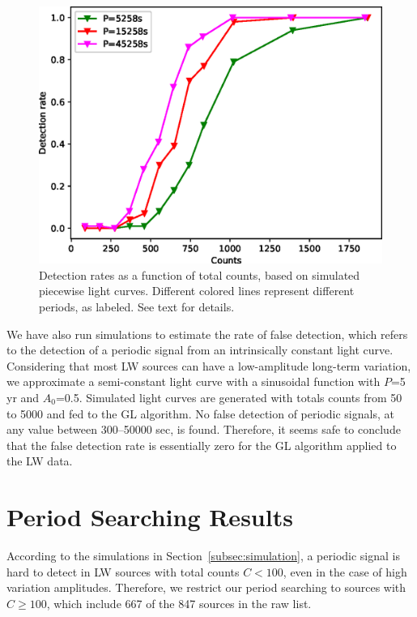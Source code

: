 \documentclass[fleqn,usenatbib]{mnras}
\begin{document}
\begin{figure}
\centering
\includegraphics[scale=0.61]{./figure/sim_LW/eclipse_cut.eps}
\caption{Detection rates as a function of total counts, based on simulated piecewise light curves. Different colored lines represent different periods, as labeled. See text for details.}\label{fig:eclipse}
\end{figure}

We have also run simulations to estimate the rate of false detection, which refers to the detection of a periodic signal from an intrinsically constant light curve. 
Considering that most LW sources can have a low-amplitude long-term variation, we approximate a semi-constant light curve with a sinusoidal function with $P$=5 yr and $A_0$=0.5. 
Simulated light curves are generated with totals counts from 50 to 5000 and fed to the GL algorithm. No false detection of periodic signals, at any value between 300--50000 sec, is found. 
Therefore, it seems safe to conclude that the false detection rate is essentially zero for the GL algorithm applied to the LW data. 

\section{Period Searching Results}\label{sec:results}
According to the simulations in Section~\ref{subsec:simulation}, a periodic signal is hard to detect in LW sources with total counts $C<100$, even in the case of high variation amplitudes.  
Therefore, we restrict our period searching to sources with $C \geq 100$, which include 667 of the 847 sources in the raw list.
\end{document}
